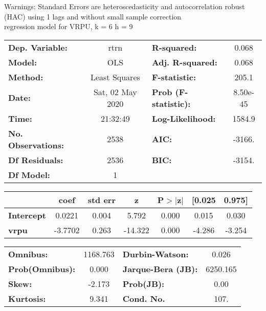 Warnings: \newline
 [1] Standard Errors are heteroscedasticity and autocorrelation robust (HAC) using 1 lags and without small sample correction\\ 

regression model for VRPU, k = 6 h = 9\begin{center}
\begin{tabular}{lclc}
\toprule
\textbf{Dep. Variable:}    &       rtrn       & \textbf{  R-squared:         } &     0.068   \\
\textbf{Model:}            &       OLS        & \textbf{  Adj. R-squared:    } &     0.068   \\
\textbf{Method:}           &  Least Squares   & \textbf{  F-statistic:       } &     205.1   \\
\textbf{Date:}             & Sat, 02 May 2020 & \textbf{  Prob (F-statistic):} &  8.50e-45   \\
\textbf{Time:}             &     21:32:49     & \textbf{  Log-Likelihood:    } &    1584.9   \\
\textbf{No. Observations:} &        2538      & \textbf{  AIC:               } &    -3166.   \\
\textbf{Df Residuals:}     &        2536      & \textbf{  BIC:               } &    -3154.   \\
\textbf{Df Model:}         &           1      & \textbf{                     } &             \\
\bottomrule
\end{tabular}
\begin{tabular}{lcccccc}
                   & \textbf{coef} & \textbf{std err} & \textbf{z} & \textbf{P$> |$z$|$} & \textbf{[0.025} & \textbf{0.975]}  \\
\midrule
\textbf{Intercept} &       0.0221  &        0.004     &     5.792  &         0.000        &        0.015    &        0.030     \\
\textbf{vrpu}      &      -3.7702  &        0.263     &   -14.322  &         0.000        &       -4.286    &       -3.254     \\
\bottomrule
\end{tabular}
\begin{tabular}{lclc}
\textbf{Omnibus:}       & 1168.763 & \textbf{  Durbin-Watson:     } &    0.026  \\
\textbf{Prob(Omnibus):} &   0.000  & \textbf{  Jarque-Bera (JB):  } & 6250.165  \\
\textbf{Skew:}          &  -2.173  & \textbf{  Prob(JB):          } &     0.00  \\
\textbf{Kurtosis:}      &   9.341  & \textbf{  Cond. No.          } &     107.  \\
\bottomrule
\end{tabular}
\end{center}

